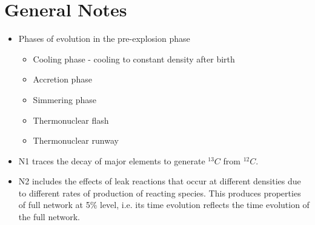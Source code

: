 \documentclass[11pt]{article}
\begin{document}
\section{General Notes}
	\begin{itemize}
		\item Phases of evolution in the pre-explosion phase
			\begin{itemize}
				\item Cooling phase - cooling to constant density after birth
				\item Accretion phase
				\item Simmering phase
				\item Thermonuclear flash
				\item Thermonuclear runway
			\end{itemize}
		\item N1 traces the decay of major elements to generate $^{13}C$ from $^{12}C$.
		\item N2 includes the effects of leak reactions that occur at different densities due to different rates of production of reacting species. This produces properties of full network at 5\% level, i.e. its time evolution reflects the time evolution of the full network.
	\end{itemize}
\end{document}
